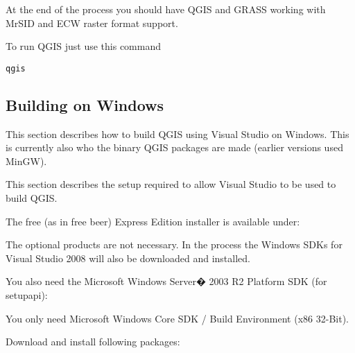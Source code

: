 At the end of the process you should have QGIS and GRASS working with MrSID and ECW
raster format support.

To run QGIS just use this command 

\begin{verbatim}
qgis
\end{verbatim}


\hypertarget{toc14}{}
\subsection{Building on Windows}
\hypertarget{toc15}{}
This section describes how to build QGIS using Visual Studio on Windows.  This
is currently also who the binary QGIS packages are made (earlier versions used
MinGW).

This section describes the setup required to allow Visual Studio to be used to
build QGIS. 

The free (as in free beer) Express Edition installer is available under:

	\begin{quotation}
	\end{quotation}

The optional products are not necessary.  In the process the Windows SDKs for
Visual Studio 2008 will also be downloaded and installed.

You also need the Microsoft Windows Server� 2003 R2 Platform SDK (for setupapi):

	\begin{quotation}
	\end{quotation}

You only need Microsoft Windows Core SDK / Build Environment (x86 32-Bit).

Download and install following packages:


